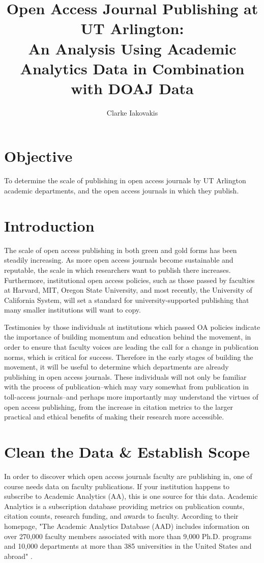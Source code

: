 \documentclass{article}
\begin{document}


\title{\bf Open Access Journal Publishing at UT Arlington: \\ \large An Analysis Using Academic Analytics Data in Combination with DOAJ Data}
\author{Clarke Iakovakis}
\maketitle


\section{Objective}
To determine the scale of publishing in open access journals by UT Arlington academic departments, and the open access journals in which they publish.

\section{Introduction}
The scale of open access publishing in both green and gold forms has been steadily increasing. 
As more open access journals become sustainable and reputable, the scale in which researchers want to publish there increases. 
Furthermore, institutional open access policies, such as those passed by faculties at Harvard, MIT, Oregon State University, and most recently, the University of California System, will set a standard for university-supported publishing that many smaller institutions will want to copy.

Testimonies by those individuals at institutions which passed OA policies indicate the importance of building momentum and education behind the movement, in order to ensure that faculty voices are leading the call for a change in publication norms, which is critical for success. 
Therefore in the early stages of building the movement, it will be useful to determine which departments are already publishing in open access journals. 
These individuals will not only be familiar with the process of publication--which may vary somewhat from publication in toll-access journals--and perhaps more importantly may understand the virtues of open access publishing, from the increase in citation metrics to the larger practical and ethical benefits of making their research more accessible.


\section{Clean the Data \& Establish Scope}
In order to discover which open access journals faculty are publishing in, one of course needs data on faculty publications. 
If your institution happens to subscribe to Academic Analytics (AA), this is one source for this data. 
Academic Analytics is a subscription database providing metrics on publication counts, citation counts, research funding, and awards to faculty. 
According to their homepage, "The Academic Analytics Database (AAD) includes information on over 270,000 faculty members associated with more than 9,000 Ph.D. programs and 10,000 departments at more than 385 universities in the United States and abroad" \cite{AcadAn}.
\end{document}
